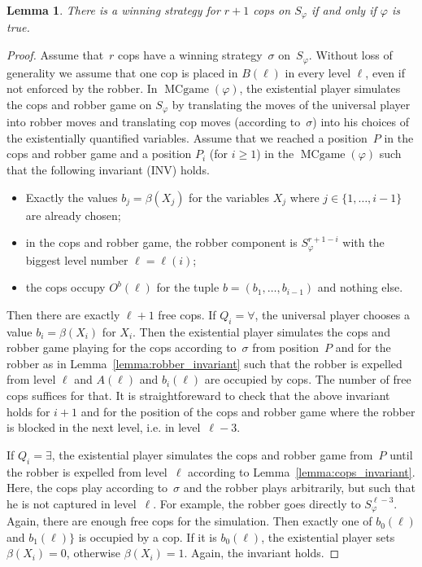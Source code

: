 \documentclass[authoryear]{article}
\makeatletter
\newtheorem{lemma}[theorem]{Lemma}
\theoremstyle{definition}
\renewcommand{\phi}{\varphi}
\newcommand{\0}{\emptyset}
\DeclareMathOperator{\MCGAME}{MCgame}
\newcommand{\ie}{i.e.\@\xspace}
\makeatother
\begin{document}
\begin{lemma}
  There is a winning strategy for $r+1$ cops on $S_\phi$ if and only if
  $\phi$ is true.
\end{lemma}
\begin{proof}
  Assume that~$r$ cops have a winning strategy~$\sigma$ on~$S_\phi$. Without
  loss of generality we assume that one cop is placed in $B(\ell)$ in every
  level $\ell$, even if not enforced by the robber. In $\MCGAME(\phi)$, the
  existential player simulates the cops and robber game on $S_\phi$ by
  translating the moves of the universal player into robber moves and
  translating cop moves (according to~$\sigma$) into his choices of the
  existentially quantified variables. Assume that we reached a position~$P$ in
  the cops and robber game and a position $P_i$ (for $i\ge 1$) in the
  $\MCGAME(\phi)$ such that the following invariant (INV) holds.
\begin{itemize}
 \item Exactly the values $b_j = \beta(X_j)$ for the variables $X_j$ where 
$j\in\{1,\ldots,i-1\}$ are already chosen;

\item in the cops and robber game, the robber component is $S_\phi^{r+1-i}$ with
  the biggest level number $\ell = \ell(i)$;

\item the cops occupy $O^b(\ell)$ for the tuple $b =
  (b_1,\ldots,b_{i-1})$ and nothing else. 
\end{itemize}
Then there are exactly $\ell+1$ free cops. If $Q_i = \forall$, the
universal player chooses a value $b_i = \beta(X_i)$ for $X_i$. Then
the existential player simulates the cops and robber game playing for
the cops according to~$\sigma$ from position~$P$ and for the robber as in
Lemma~\ref{lemma:robber_invariant} such that the robber is expelled
from level $\ell$ and $A(\ell)$ and $b_i(\ell)$ are occupied by cops. The number of
free cops suffices for that. It is straightforeward to check that the
above invariant holds for $i+1$ and for the position of the cops and
robber game where the robber is blocked in the next level, \ie in level~$\ell-3$.

If $Q_i = \exists$, the existential player simulates the cops and robber 
game from~$P$ until the robber is expelled from level~$\ell$ according to 
Lemma~\ref{lemma:cops_invariant}. Here, the cops play according
to~$\sigma$ and the robber plays arbitrarily, but such that he is not
captured in level~$\ell$. For example, the robber goes directly to
$S_\phi^{\ell -3}$. Again, there are enough free cops for 
the simulation. Then exactly one of $b_0(\ell)$ and $b_1(\ell)\}$ is  occupied
by a cop. If it is $b_0(\ell)$, the existential player sets $\beta(X_i) = 0$, 
otherwise $\beta(X_i) = 1$. Again, the invariant holds.


\end{proof}
\end{document}
